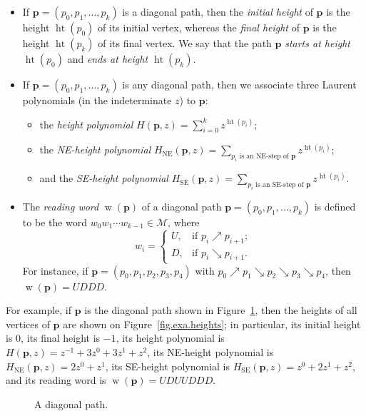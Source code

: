 \documentclass[numbers=enddot,12pt,final,onecolumn,notitlepage]{scrartcl}%
\theoremstyle{definition}
\newcommand{\M}{\mathcal{M}}
\newcommand{\pp}{\mathbf{p}}
\newcommand{\SE}{\operatorname{SE}}
\newcommand{\NE}{\operatorname{NE}}
\newcommand{\w}{\operatorname{w}}
\newcommand{\htt}{\operatorname{ht}}
\newcommand{\tup}[1]{\left( #1 \right)}
\begin{document}
\begin{itemize}
\item If $\pp = \tup{p_0, p_1, \ldots, p_k}$ is a diagonal path, then the \emph{initial height} of $\pp$ is the height $\htt\tup{p_0}$ of its initial vertex, whereas the \emph{final height} of $\pp$ is the height $\htt\tup{p_k}$ of its final vertex.
We say that the path $\pp$ \emph{starts at height $\htt\tup{p_0}$} and \emph{ends at height $\htt\tup{p_k}$}.

\item If $\pp = (p_0,p_1,\ldots,p_k)$ is any diagonal path, then we associate three Laurent polynomials (in the indeterminate $z$) to $\pp$:
    \begin{itemize}
    \item the \emph{height polynomial} $H(\pp,z) = \sum\limits_{i=0}^k z^{\htt(p_i)}$;
    \item the \emph{NE-height polynomial} $H_{\NE}(\pp,z) = \sum\limits_{p_{i}\text{ is an NE-step of }\pp} z^{\htt(p_i)}$;
    \item and the \emph{SE-height polynomial} $H_{\SE}(\pp,z) = \sum\limits_{p_{i}\text{ is an SE-step of }\pp} z^{\htt(p_i)}$.
    \end{itemize}

\item The \emph{reading word} $\w\left(  \pp\right)  $ of a diagonal
path $\pp=\left(  p_{0},p_{1},\ldots,p_{k}\right)  $ is defined to be
the word $w_{0}w_{1}\cdots w_{k-1}\in\M$, where%
\[
w_{i}=%
\begin{cases}
U, & \text{if }p_{i}\nearrow p_{i+1};\\
D, & \text{if }p_{i}\searrow p_{i+1}.
\end{cases}
\]
For instance, if $\pp = \tup{p_0, p_1, p_2, p_3, p_4}$ with $p_0 \nearrow p_1 \searrow p_2 \searrow p_3 \searrow p_4$, then $\w\tup{\pp} = UDDD$.
\end{itemize}

For example, if $\pp$ is the diagonal path shown in Figure~\ref{fig.exa.wp.1}, then
the heights of all vertices of $\pp$ are shown on Figure~\ref{fig.exa.heights}; in particular,
its initial height is $0$, its final height is $-1$, its height polynomial is $H\tup{\pp, z} = z^{-1} + 3z^0 + 3z^1 + z^2$,
its NE-height polynomial is $H_{\NE}\tup{\pp, z} = 2z^0 + z^1$,
its SE-height polynomial is $H_{\SE}\tup{\pp, z} = z^0 + 2z^1 + z^2$,
and its reading word is $\w\tup{\pp} = UDUUDDD$.

\begin{figure}[htbp]
\begin{center}
\end{center}
\caption{A diagonal path.}
\label{fig.exa.wp.1}
\end{figure}
\end{document}
